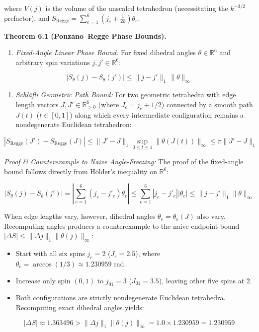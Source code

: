 \documentclass[11pt]{article}
\begin{document}
where $V(j)$ is the volume of the unscaled tetrahedron (necessitating the $k^{-3/2}$ prefactor), and $S_{\mathrm{Regge}} = \sum_{e=1}^6 \left(j_e + \frac{1}{2k}\right) \theta_e$.

\textbf{Theorem 6.1 (Ponzano--Regge Phase Bounds).}

\begin{enumerate}[leftmargin=1.4em,itemsep=0.2em]
\item \emph{Fixed-Angle Linear Phase Bound:} For fixed dihedral angles $\theta \in \mathbb{R}^6$ and arbitrary spin variations $j, j' \in \mathbb{R}^6$:
\end{enumerate}
\begin{equation*}
   |S_\theta(j) - S_\theta(j')| \le \|j - j'\|_1 \, \|\theta\|_\infty
\end{equation*}

\begin{enumerate}[leftmargin=1.4em,itemsep=0.2em]
\item \emph{Schläfli Geometric Path Bound:} For two geometric tetrahedra with edge length vectors $J, J' \in \mathbb{R}_{>0}^6$ (where $J_e = j_e + 1/2$) connected by a smooth path $J(t)$ ($t \in [0, 1]$) along which every intermediate configuration remains a nondegenerate Euclidean tetrahedron:
\end{enumerate}
\begin{equation*}
   |S_{\mathrm{Regge}}(J') - S_{\mathrm{Regge}}(J)| \le \|J' - J\|_1 \sup_{0 \le t \le 1} \|\theta(J(t))\|_\infty \le \pi \|J' - J\|_1
\end{equation*}

\emph{Proof \& Counterexample to Naive Angle-Freezing:} The proof of the fixed-angle bound follows directly from Hölder's inequality on $\mathbb{R}^6$:

\begin{equation*}
|S_\theta(j) - S_\theta(j')| = \left| \sum_{e=1}^6 (j_e - j'_e) \theta_e \right| \le \sum_{e=1}^6 |j_e - j'_e| |\theta_e| \le \|j - j'\|_1 \|\theta\|_\infty
\end{equation*}

When edge lengths vary, however, dihedral angles $\theta_e = \theta_e(J)$ also vary. Recomputing angles produces a counterexample to the naive endpoint bound $|\Delta S| \le \|\Delta j\|_1 \|\theta(j)\|_\infty$:

\begin{itemize}[leftmargin=1.4em,itemsep=0.2em]
\item Start with all six spins $j_e = 2$ ($J_e = 2.5$), where $\theta_e = \arccos(1/3) \approx 1.230959$ rad.
\item Increase only spin $(0, 1)$ to $j_{01} = 3$ ($J_{01} = 3.5$), leaving other five spins at 2.
\item Both configurations are strictly nondegenerate Euclidean tetrahedra. Recomputing exact dihedral angles yields:
\end{itemize}
\begin{equation*}
  |\Delta S| \approx 1.363496 > \|\Delta j\|_1 \|\theta(j)\|_\infty = 1.0 \times 1.230959 = 1.230959
\end{equation*}
\end{document}
